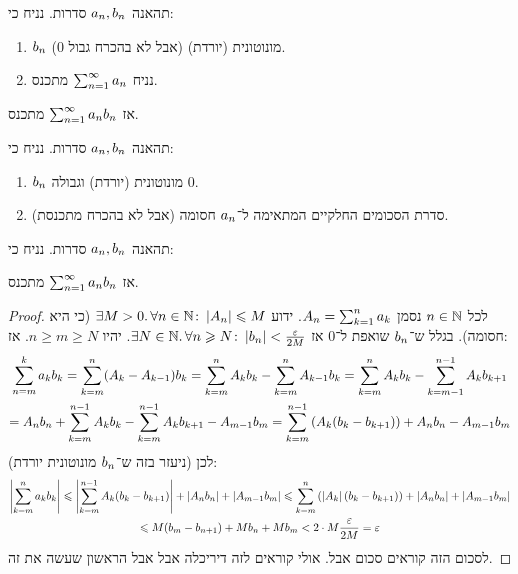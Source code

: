 \documentclass[name=רשימות חשבון דיפרנציאלי ואינטגרלי 1א]{../../../tex/classes/megasumPreamble}
\begin{document}
	\begin{Theorem}
		תהאנה $a_n, b_n$ סדרות. נניח כי:
		\begin{enumerate}
			\item $b_n$ מונוטונית (יורדת) (אבל לא בהכרח גבול $0$).
			\item נניח $\sum_{n = 1}^{\infty} a_n$ מתכנס.
		\end{enumerate}
		אז $\sum_{n = 1}^{\infty} a_n b_n$ מתכנס.
	\end{Theorem}

	\begin{Theorem}
		תהאנה $a_n, b_n$ סדרות. נניח כי:
		\begin{enumerate}
			\item $b_n$ מונוטונית (יורדת) וגבולה $0$.
			\item סדרת הסכומים החלקיים המתאימה ל־$a_n$ חסומה (אבל לא בהכרח מתכנסת).
		\end{enumerate}
		תהאנה $a_n, b_n$ סדרות. נניח כי:
		
		אז $\sum_{n = 1}^{\infty} a_n b_n$ מתכנס.
	\end{Theorem}

	\begin{proof}
		לכל $n \in \mathbb{N}$ נסמן $A_n = \sum_{k = 1}^{n} a_k$. ידוע $\exists M > 0 .\, \forall n \in \mathbb{N} \colon \left \lvert A_n \right \rvert \leqslant M$ (כי היא חסומה). בגלל ש־$b_n$ שואפת ל־0 אז $\exists N \in \N.\, \forall n \ge N \co \sof{b_n} < \frac{\eg}{2M}$. יהיו $n \ge m \ge N$. אז:
		\begin{multline*}
			\sum_{n = m}^{k} a_k b_k = \sum_{k = m}^{n}(A_k - A_{k - 1})b_k = \sum_{k = m}^{n}A_k b_k - \sum_{k =m}^{n}A_{k - 1}b_k = \sum_{k = m}^{n}A_k b_k - \sum_{k = m - 1}^{n - 1}A_k b_{k + 1} \\
			= A_n b_n + \sum_{k = m}^{n - 1}A_k b_k - \sum_{k = m}^{n - 1}A_k b_{k + 1} - A_{m - 1}b_m = \sum_{k = m}^{n - 1}\left ( A_k(b_k - b_{k + 1}) \right ) + A_nb_n - A_{m - 1}b_m
		\end{multline*}
		לכן (ניעזר בזה ש־$b_n$ מונוטונית יורדת):
		\begin{multline*}
			\sof{\sum_{k = m}^{n}a_kb_k} \le \sof{\sum_{k = m}^{n - 1}A_k(b_k - b_{k + 1})} + \sof{A_nb_n} + \sof{A_{m - 1}b_m} \le \sum_{k = m}^{n} \cl{\sof {A_k}(b_k - b_{k + 1})} + \sof{A_nb_n} + \sof{A_{m - 1}b_m} \\
			\le M(b_m - b_{n + 1}) + Mb_n + Mb_m < 2 \cdot M \frac{\eg}{2M} = \eg
		\end{multline*}
		לסכום הזה קוראים סכום אבל. אולי קוראים לזה דיריכלה אבל אבל הראשון שעשה את זה.
	\end{proof}
\end{document}
